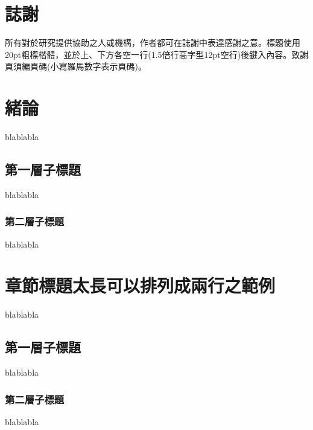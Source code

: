 \documentclass[12pt]{ncut}
\begin{document}
\newpage

\section{誌謝}

\indent
所有對於研究提供協助之人或機構，作者都可在誌謝中表達感謝之意。標題使用 20pt粗標楷體，並於上、下方各空一行(1.5倍行高字型12pt空行)後鍵入內容。致謝頁須編頁碼(小寫羅馬數字表示頁碼)。

\newpage

\tableofcontents
\newpage

\listoftables
\newpage

\listoffigures
\newpage


\setcounter{section}{0} %
\renewcommand{\thesection}{第\zhnum{section}章\ }
\section{緒論}
blablabla

\subsection{第一層子標題}
blablabla

\subsubsection{第二層子標題}
blablabla

\newpage

\section{章節標題太長可以排列成兩行之範例}
blablabla\cite{8643999}
\subsection{第一層子標題}
blablabla
\subsubsection{第二層子標題}
blablabla

\newpage

\newpage
\printbibliography[title={\centering 參考文獻}]
\end{document}
